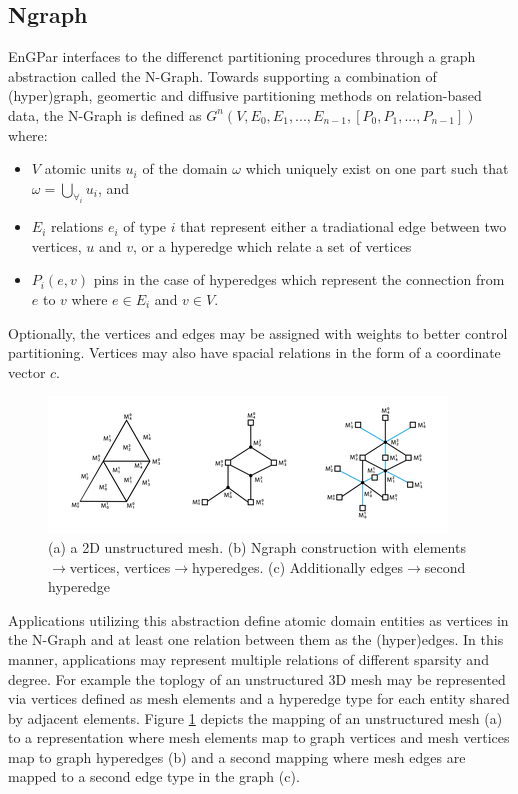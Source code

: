 \documentclass[a4paper]{article}
\begin{document}
\subsection{Ngraph}
EnGPar interfaces to the differenct partitioning procedures through a graph abstraction called the N-Graph. Towards supporting a combination of (hyper)graph, geomertic and diffusive partitioning methods on relation-based data, the N-Graph is defined as $G^n(V,E_0,E_1,...,E_{n-1},[P_0,P_1,...,P_{n-1}])$ where:
\begin{itemize}
  \item $V$ atomic units $u_i$ of the domain $\omega$ which uniquely exist on one
    part such that $\omega = \bigcup_{\forall_i}u_i$, and 
  \item $E_i$ relations $e_i$ of type $i$ that represent either a tradiational edge between two vertices, $u$ and $v$, or a hyperedge which relate a set of vertices
  \item $P_i(e,v)$ pins in the case of hyperedges which represent the connection
    from $e$ to $v$ where $e \in E_i$ and $v \in V$.
\end{itemize}
Optionally, the vertices and edges may be assigned with weights to better control partitioning. Vertices may also have spacial relations in the form of a coordinate vector $c$.

\begin{figure}[!ht]
  \label{fig:Mesh2Graph}
  \centering
  \includegraphics[width=\textwidth]{exampleMesh2Graph.png}
  \caption{(a) a 2D unstructured mesh. (b) Ngraph construction with elements$\rightarrow$vertices, vertices$\rightarrow$hyperedges. (c) Additionally edges$\rightarrow$second hyperedge}
\end{figure}

Applications utilizing this abstraction define atomic domain entities as vertices in the N-Graph and at least one relation between them as the (hyper)edges. In this manner, applications may represent multiple relations of different sparsity and degree. For example the toplogy of an unstructured 3D mesh may be represented via vertices defined as mesh elements and a hyperedge type for each entity shared by adjacent elements. Figure \ref{fig:Mesh2Graph} depicts the mapping of an unstructured mesh (a) to a representation where mesh elements map to graph vertices and mesh vertices map to graph hyperedges (b) and a second mapping where mesh edges are mapped to a second edge type in the graph (c).
\end{document}
